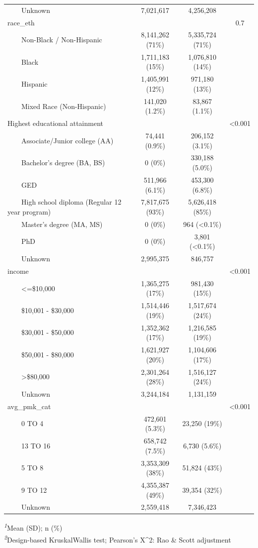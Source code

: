 \documentclass[
]{article}
\begin{document}
\begin{table}[t]
\begin{tabular*}{\linewidth}{@{\extracolsep{\fill}}lccc}
    Unknown & 7,021,617 & 4,256,208 &  \\ 
race\_eth &  &  & 0.7 \\ 
    Non-Black / Non-Hispanic & 8,141,262 (71\%) & 5,335,724 (71\%) &  \\ 
    Black & 1,711,183 (15\%) & 1,076,810 (14\%) &  \\ 
    Hispanic & 1,405,991 (12\%) & 971,180 (13\%) &  \\ 
    Mixed Race (Non-Hispanic) & 141,020 (1.2\%) & 83,867 (1.1\%) &  \\ 
Highest educational attainment &  &  & <0.001 \\ 
    Associate/Junior college (AA) & 74,441 (0.9\%) & 206,152 (3.1\%) &  \\ 
    Bachelor's degree (BA, BS) & 0 (0\%) & 330,188 (5.0\%) &  \\ 
    GED & 511,966 (6.1\%) & 453,300 (6.8\%) &  \\ 
    High school diploma (Regular 12 year program) & 7,817,675 (93\%) & 5,626,418 (85\%) &  \\ 
    Master's degree (MA, MS) & 0 (0\%) & 964 (<0.1\%) &  \\ 
    PhD & 0 (0\%) & 3,801 (<0.1\%) &  \\ 
    Unknown & 2,995,375 & 846,757 &  \\ 
income &  &  & <0.001 \\ 
    <=\$10,000 & 1,365,275 (17\%) & 981,430 (15\%) &  \\ 
    \$10,001 - \$30,000 & 1,514,446 (19\%) & 1,517,674 (24\%) &  \\ 
    \$30,001 - \$50,000 & 1,352,362 (17\%) & 1,216,585 (19\%) &  \\ 
    \$50,001 - \$80,000 & 1,621,927 (20\%) & 1,104,606 (17\%) &  \\ 
    >\$80,000 & 2,301,264 (28\%) & 1,516,127 (24\%) &  \\ 
    Unknown & 3,244,184 & 1,131,159 &  \\ 
avg\_pmk\_cat &  &  & <0.001 \\ 
    0 TO 4 & 472,601 (5.3\%) & 23,250 (19\%) &  \\ 
    13 TO 16 & 658,742 (7.5\%) & 6,730 (5.6\%) &  \\ 
    5 TO 8 & 3,353,309 (38\%) & 51,824 (43\%) &  \\ 
    9 TO 12 & 4,355,387 (49\%) & 39,354 (32\%) &  \\ 
    Unknown & 2,559,418 & 7,346,423 &  \\ 
\bottomrule
\end{tabular*}
\begin{minipage}{\linewidth}
\textsuperscript{\textit{1}}Mean (SD); n (\%)\\
\textsuperscript{\textit{2}}Design-based KruskalWallis test; Pearson's X\^{}2: Rao \& Scott adjustment\\
\end{minipage}
\end{table}
\end{document}
